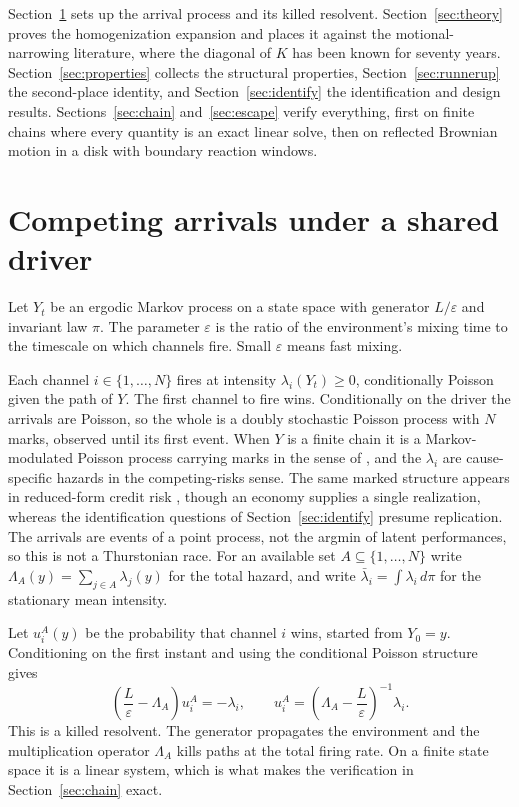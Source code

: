 \documentclass[11pt]{article}
\theoremstyle{remark}
\newcommand{\lbar}{\bar{\lambda}}
\begin{document}
Section~\ref{sec:model} sets up the arrival process and its killed resolvent.
Section~\ref{sec:theory} proves the homogenization expansion and places it
against the motional-narrowing literature, where the diagonal of $K$ has been
known for seventy years. Section~\ref{sec:properties} collects the structural
properties, Section~\ref{sec:runnerup} the second-place identity, and
Section~\ref{sec:identify} the identification and design results.
Sections~\ref{sec:chain} and~\ref{sec:escape} verify everything, first on
finite chains where every quantity is an exact linear solve, then on reflected
Brownian motion in a disk with boundary reaction windows.

\section{Competing arrivals under a shared driver}\label{sec:model}

Let $Y_t$ be an ergodic Markov process on a state space with generator
$L/\varepsilon$ and invariant law $\pi$. The parameter $\varepsilon$ is the
ratio of the environment's mixing time to the timescale on which channels
fire. Small $\varepsilon$ means fast mixing.

Each channel $i \in \{1, \dots, N\}$ fires at intensity $\lambda_i(Y_t) \ge 0$,
conditionally Poisson given the path of $Y$. The first channel to fire wins.
Conditionally on the driver the arrivals are Poisson, so the whole is a doubly
stochastic Poisson process \citep{cox1955,grandell1976} with $N$ marks,
observed until its first event. When $Y$ is a finite chain it is a
Markov-modulated Poisson process \citep{fischer1993} carrying marks in the
sense of \citet{heneuts1998}, and the $\lambda_i$ are cause-specific hazards
in the competing-risks sense. The same
marked structure appears in reduced-form credit risk \citep{lando1998}, though
an economy supplies a single realization, whereas the identification questions
of Section~\ref{sec:identify} presume replication. The arrivals are events of a point process, not the
argmin of latent performances, so this is not a Thurstonian race.
For an available set $A \subseteq \{1, \dots, N\}$ write
$\Lambda_A(y) = \sum_{j \in A}\lambda_j(y)$ for the total hazard, and write
$\lbar_i = \int \lambda_i \, d\pi$ for the stationary mean intensity.

Let $u_i^A(y)$ be the probability that channel $i$ wins, started from $Y_0 = y$.
Conditioning on the first instant and using the conditional Poisson structure
gives
\begin{equation}\label{eq:resolvent}
  \left(\frac{L}{\varepsilon} - \Lambda_A\right) u_i^A = -\lambda_i ,
  \qquad
  u_i^A = \left(\Lambda_A - \frac{L}{\varepsilon}\right)^{-1}\lambda_i .
\end{equation}
This is a killed resolvent. The generator propagates the environment and the
multiplication operator $\Lambda_A$ kills paths at the total firing rate. On a
finite state space it is a linear system, which is what makes the verification
in Section~\ref{sec:chain} exact.
\end{document}
